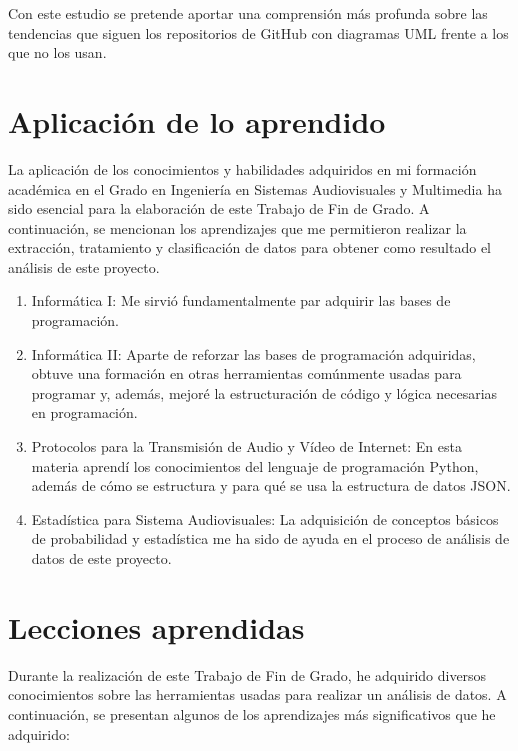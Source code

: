 \documentclass[a4paper, 12pt]{book}
\begin{document}
Con este estudio se pretende aportar una comprensión más profunda sobre las tendencias que siguen los repositorios de GitHub con diagramas UML frente a los que no los usan.


\section{Aplicación de lo aprendido}
\label{sec:aplicacion}

La aplicación de los conocimientos y habilidades adquiridos en mi formación académica en el Grado en Ingeniería en Sistemas Audiovisuales y Multimedia ha sido esencial para la elaboración de este Trabajo de Fin de Grado.
A continuación, se mencionan los aprendizajes que me permitieron realizar la extracción, tratamiento y clasificación de datos para obtener como resultado el análisis de este proyecto. 

\begin{enumerate}
  \item Informática I: Me sirvió fundamentalmente par adquirir las bases de programación.
  \item Informática II: Aparte de reforzar las bases de programación adquiridas, obtuve una formación en otras herramientas comúnmente usadas para programar y, además, mejoré la estructuración de código y lógica necesarias en programación.
  \item Protocolos para la Transmisión de Audio y Vídeo de Internet: En esta materia aprendí los conocimientos del lenguaje de programación Python, además de cómo se estructura y para qué se usa la estructura de datos JSON.
  \item Estadística para Sistema Audiovisuales: La adquisición de conceptos básicos de probabilidad y estadística me ha sido de ayuda en el proceso de análisis de datos de este proyecto. 
\end{enumerate}


\section{Lecciones aprendidas}
\label{sec:lecciones_aprendidas}

Durante la realización de este Trabajo de Fin de Grado, he adquirido diversos conocimientos sobre las herramientas usadas para realizar un análisis de datos. 
A continuación, se presentan algunos de los aprendizajes más significativos que he adquirido:
\end{document}

